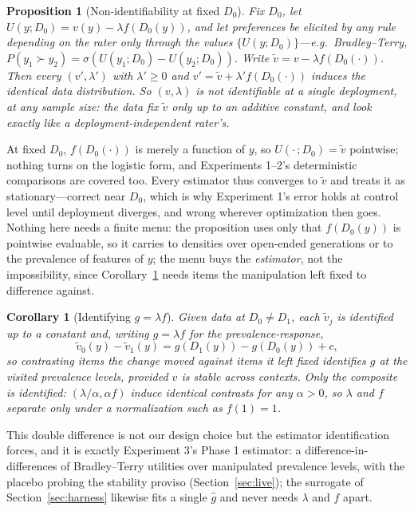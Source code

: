 ﻿\documentclass[11pt]{article}
\newtheorem{proposition}{Proposition}
\newtheorem{corollary}{Corollary}
\begin{document}
\begin{proposition}[Non-identifiability at fixed \(D_0\)]
\label{prop:nonident}
Fix \(D_0\), let \(U(y; D_0) = v(y) - \lambda f(D_0(y))\), and let preferences be elicited by any rule depending on the rater only through the values \(\{U(y; D_0)\}\)---e.g.\ Bradley--Terry, \(P(y_1 \succ y_2) = \sigma(U(y_1; D_0) - U(y_2; D_0))\). Write \(\tilde v = v - \lambda f(D_0(\cdot))\). Then every \((v', \lambda')\) with \(\lambda' \geq 0\) and \(v' = \tilde v + \lambda' f(D_0(\cdot))\) induces the identical data distribution. So \((v, \lambda)\) is not identifiable at a single deployment, at any sample size: the data fix \(\tilde v\) only up to an additive constant, and look exactly like a deployment-\emph{independent} rater's.
\end{proposition}

At fixed \(D_0\), \(f(D_0(\cdot))\) is merely a function of \(y\), so \(U(\cdot\,; D_0) = \tilde v\) pointwise; nothing turns on the logistic form, and Experiments 1--2's deterministic comparisons are covered too. Every estimator thus converges to \(\tilde v\) and treats it as stationary---correct near \(D_0\), which is why Experiment 1's error holds at control level until deployment diverges, and wrong wherever optimization then goes. Nothing here needs a finite menu: the proposition uses only that \(f(D_0(y))\) is pointwise evaluable, so it carries to densities over open-ended generations or to the prevalence of features of \(y\); the menu buys the \emph{estimator}, not the impossibility, since Corollary~\ref{cor:did} needs items the manipulation left fixed to difference against.

\begin{corollary}[Identifying \(g = \lambda f\)]
\label{cor:did}
Given data at \(D_0 \neq D_1\), each \(\tilde v_j\) is identified up to a constant and, writing \(g = \lambda f\) for the prevalence-response,
\[\tilde v_0(y) - \tilde v_1(y) = g(D_1(y)) - g(D_0(y)) + c,\]
so contrasting items the change moved against items it left fixed identifies \(g\) at the visited prevalence levels, provided \(v\) is stable across contexts. Only the composite is identified: \((\lambda/\alpha, \alpha f)\) induce identical contrasts for any \(\alpha > 0\), so \(\lambda\) and \(f\) separate only under a normalization such as \(f(1) = 1\).
\end{corollary}

This double difference is not our design choice but the estimator identification forces, and it is exactly Experiment 3's Phase 1 estimator: a difference-in-differences of Bradley--Terry utilities over manipulated prevalence levels, with the placebo probing the stability proviso (Section~\ref{sec:live}); the surrogate of Section~\ref{sec:harness} likewise fits a single \(\hat g\) and never needs \(\lambda\) and \(f\) apart.
\end{document}
